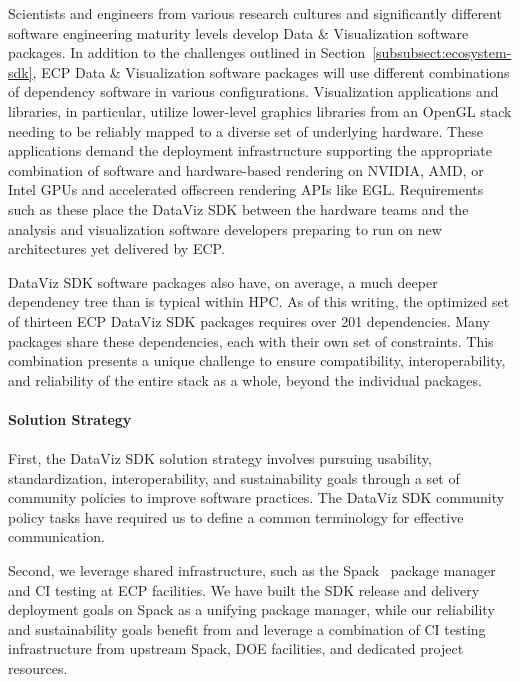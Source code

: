 Scientists and engineers from various research cultures and significantly different software engineering maturity levels develop Data \& Visualization software packages. In addition to the challenges outlined in Section~\ref{subsubsect:ecosystem-sdk}, ECP Data \& Visualization software packages will use different combinations of dependency software in various configurations. Visualization applications and libraries, in particular, utilize lower-level graphics libraries from an OpenGL stack needing to be reliably mapped to a diverse set of underlying hardware.  These applications demand the deployment infrastructure supporting the appropriate combination of software and hardware-based rendering on NVIDIA, AMD, or Intel GPUs and accelerated offscreen rendering APIs like EGL.  Requirements such as these place the DataViz SDK between the hardware teams and the analysis and visualization software developers preparing to run on new architectures yet delivered by ECP.

DataViz SDK software packages also have, on average, a much deeper dependency tree than is typical within HPC.  As of this writing, the optimized set of thirteen ECP DataViz SDK packages requires over 201 dependencies.  Many packages share these dependencies, each with their own set of constraints.  This combination presents a unique challenge to ensure compatibility, interoperability, and reliability of the entire stack as a whole, beyond the individual packages.

\paragraph{\textbf{Solution Strategy}}
\paragraph{}

First, the DataViz SDK solution strategy involves pursuing usability, standardization, interoperability, and sustainability goals through a set of community policies to improve software practices. The DataViz SDK community policy tasks have required us to define a common terminology for effective communication.

Second, we leverage shared infrastructure, such as the Spack~\cite{gamblin+:sc15} package manager and CI testing at ECP facilities. We have built the SDK release and delivery deployment goals on Spack as a unifying package manager, while our reliability and sustainability goals benefit from and leverage a combination of CI testing infrastructure from upstream Spack, DOE facilities, and dedicated project resources.

